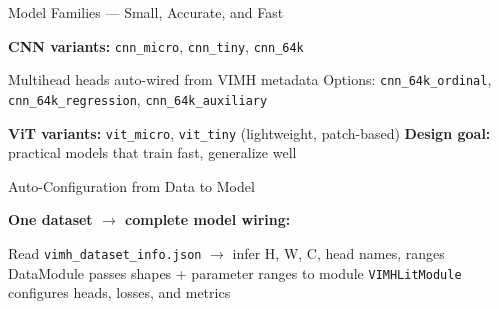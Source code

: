 \begin{slide}[\slideopts,toc={Models}]{Model Families — Small, Accurate, and Fast}
  \vspace{-0.75em}
  \begin{itemize}
    \mpitem \textbf{CNN variants:} \texttt{cnn\_micro}, \texttt{cnn\_tiny}, \texttt{cnn\_64k}
    \vspace{-0.25em}
    \begin{itemize}
      \mpitem Multihead heads auto-wired from VIMH metadata
      \mpitem Options: \texttt{cnn\_64k\_ordinal}, \texttt{cnn\_64k\_regression}, \texttt{cnn\_64k\_auxiliary}
    \end{itemize}
    \mpitem \textbf{ViT variants:} \texttt{vit\_micro}, \texttt{vit\_tiny} (lightweight, patch-based)
    \mpitem \textbf{Design goal:} practical models that train fast, generalize well
  \end{itemize}
  \vspace{0.25em}
  \begin{center}
    \begin{minipage}{0.95\linewidth}
      \centering
      \setlength{\fboxsep}{4pt}
    \end{minipage}
  \end{center}
\end{slide}

\begin{slide}[\slideopts,toc={Auto-Config}]{Auto-Configuration from Data to Model}
  \vspace{-0.75em}
  \begin{itemize}
    \mpitem \textbf{One dataset $\to$ complete model wiring:}
    \vspace{-0.25em}
    \begin{itemize}
      \mpitem Read \texttt{vimh\_dataset\_info.json} $\to$ infer H, W, C, head names, ranges
      \mpitem DataModule passes shapes + parameter ranges to module
      \mpitem \texttt{VIMHLitModule} configures heads, losses, and metrics
    \end{itemize}
  \end{itemize}
  \vspace{-0.25em}
  \begin{center}
  \end{center}
\end{slide}

